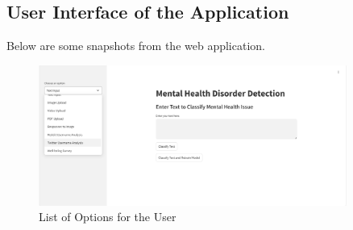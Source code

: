 
\subsection{User Interface of the Application}

\noindent
Below are some snapshots from the web application.

\begin{figure}[H]  
    \centering
    \includegraphics[width=0.9\textwidth]{App Images/01 Interface.png}  
    \caption{List of Options for the User}
    \label{01i}  %
\end{figure}


\pagebreak

